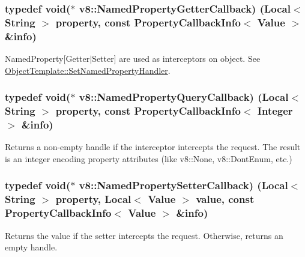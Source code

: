 \subsubsection[{\texorpdfstring{Named\+Property\+Getter\+Callback}{NamedPropertyGetterCallback}}]{\setlength{\rightskip}{0pt plus 5cm}typedef void($\ast$ v8\+::\+Named\+Property\+Getter\+Callback) ({\bf Local}$<$ {\bf String} $>$ property, const {\bf Property\+Callback\+Info}$<$ {\bf Value} $>$ \&info)}\hypertarget{namespacev8_a50cae386a68bf9ff23d02aa1161face4}{}\label{namespacev8_a50cae386a68bf9ff23d02aa1161face4}
Named\+Property\mbox{[}Getter$\vert$\+Setter\mbox{]} are used as interceptors on object. See \hyperlink{classv8_1_1ObjectTemplate_a66fa7b04c87676e20e35497ea09a0ad0}{Object\+Template\+::\+Set\+Named\+Property\+Handler}. 
\subsubsection[{\texorpdfstring{Named\+Property\+Query\+Callback}{NamedPropertyQueryCallback}}]{\setlength{\rightskip}{0pt plus 5cm}typedef void($\ast$ v8\+::\+Named\+Property\+Query\+Callback) ({\bf Local}$<$ {\bf String} $>$ property, const {\bf Property\+Callback\+Info}$<$ {\bf Integer} $>$ \&info)}\hypertarget{namespacev8_ac135beae5f0c8b290255accb438f990e}{}\label{namespacev8_ac135beae5f0c8b290255accb438f990e}
Returns a non-\/empty handle if the interceptor intercepts the request. The result is an integer encoding property attributes (like v8\+::\+None, v8\+::\+Dont\+Enum, etc.) 
\subsubsection[{\texorpdfstring{Named\+Property\+Setter\+Callback}{NamedPropertySetterCallback}}]{\setlength{\rightskip}{0pt plus 5cm}typedef void($\ast$ v8\+::\+Named\+Property\+Setter\+Callback) ({\bf Local}$<$ {\bf String} $>$ property, {\bf Local}$<$ {\bf Value} $>$ value, const {\bf Property\+Callback\+Info}$<$ {\bf Value} $>$ \&info)}\hypertarget{namespacev8_a9587769513971dc7cb301b740d9e66b6}{}\label{namespacev8_a9587769513971dc7cb301b740d9e66b6}
Returns the value if the setter intercepts the request. Otherwise, returns an empty handle. 
